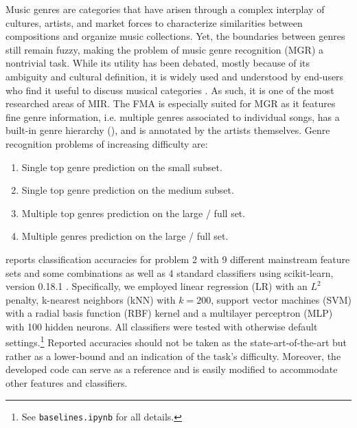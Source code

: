 \documentclass{article}
\begin{document}
Music genres are categories that have arisen through a complex interplay of cultures, artists, and market forces to characterize similarities between compositions and organize music collections. Yet, the boundaries between genres still remain fuzzy, making the problem of music genre recognition (MGR) a nontrivial task.
While its utility has been debated, mostly because of its ambiguity and cultural definition, it is widely used and understood by end-users who find it useful to discuss musical categories \cite{mgr_why}.
As such, it is one of the most researched areas of MIR.
The FMA is especially suited for MGR as it features fine genre information, i.e. multiple genres associated to individual songs, has a built-in genre hierarchy (), and is annotated by the artists themselves.
Genre recognition problems of increasing difficulty are:
\begin{enumerate}
	\item Single top genre prediction on the small subset.
	\item Single top genre prediction on the medium subset.
	\item Multiple top genres prediction on the large / full set.
	\item Multiple genres prediction on the large / full set.
\end{enumerate}


 reports classification accuracies for problem 2 with 9 different mainstream feature sets and some combinations as well as 4 standard classifiers using scikit-learn, version 0.18.1 \cite{scikit-learn}. Specifically, we employed linear regression (LR) with an $L^2$ penalty, k-nearest neighbors (kNN) with $k=200$, support vector machines (SVM) with a radial basis function (RBF) kernel and a multilayer perceptron (MLP) with 100 hidden neurons. All classifiers were tested with otherwise default settings.\footnote{See \texttt{baselines.ipynb} for all details.} Reported accuracies should not be taken as the state-art-of-the-art but rather as a lower-bound and an indication of the task's difficulty. Moreover, the developed code can serve as a reference and is easily modified to accommodate other features and classifiers.
\end{document}
